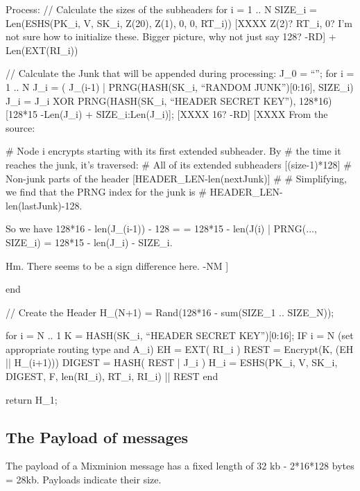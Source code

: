 Process: 
  // Calculate the sizes of the subheaders
  for i = 1 .. N
	SIZE_i = Len(ESHS(PK_i, V, SK_i, Z(20), Z(1), 0, 0, RT_i))
[XXXX                                           Z(2)?    RT_i, 0?
  I'm not sure how to initialize these. Bigger picture, why not just
  say 128? -RD]
                    + Len(EXT(RI_i))

  // Calculate the Junk that will be appended during processing:
  J_0 = ``'';
  for i = 1 .. N
	J_i = ( J_(i-1) | PRNG(HASH(SK_i, ``RANDOM JUNK'')[0:16], SIZE_i)
	J_i = J_i XOR PRNG(HASH(SK_i, ``HEADER SECRET KEY''),
  		128*16)[128*15 -Len(J_i) + SIZE_i:Len(J_i)];
[XXXX                       16? -RD]
[XXXX  From the source:

        # Node i encrypts starting with its first extended subheader.  By
        #   the time it reaches the junk, it's traversed:
        #          All of its extended subheaders    [(size-1)*128]
        #          Non-junk parts of the header      [HEADER_LEN-len(nextJunk)]
        #
        # Simplifying, we find that the PRNG index for the junk is
        #    HEADER_LEN-len(lastJunk)-128.

      So we have 128*16 - len(J_(i-1)) - 128 =
                = 128*15 - len(J(i) | PRNG(..., SIZE_i)
                = 128*15 - len(J_i) - SIZE_i.

      Hm.  There seems to be a sign difference here.
                                                     -NM ]


  end

  // Create the Header
  H_(N+1) = Rand(128*16 - sum(SIZE_1 .. SIZE_N));

  for i = N .. 1
	K = HASH(SK_i, ``HEADER SECRET KEY'')[0:16];
	IF i = N (set appropriate routing type and A_i)
	EH = EXT( RI_i )
        REST = Encrypt(K, (EH || H_(i+1)))
  	DIGEST = HASH( REST | J_i )
	H_i = ESHS(PK_i, V, SK_i, DIGEST, F, len(RI_i), RT_i, RI_i) || REST
  end

return H_1;

\subsection{The Payload of messages}

The payload of a Mixminion message has a fixed length of 32 kb
- 2*16*128 bytes = 28kb.   Payloads indicate their size.

